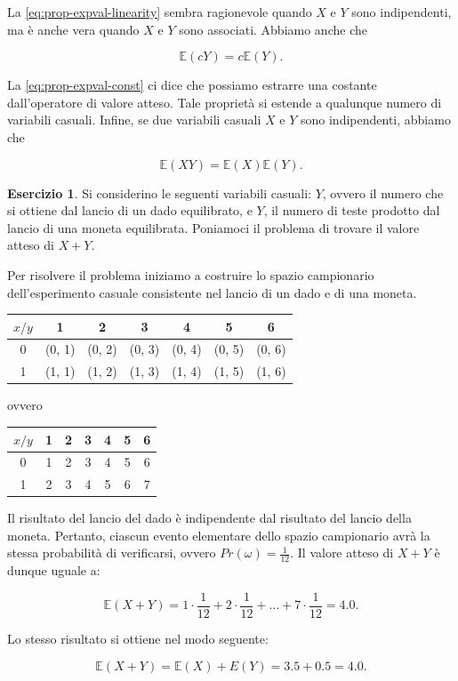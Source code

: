 \documentclass[
  11pt,
]{krantz}
\newcommand{\E}{\mathbb{E}} %
\theoremstyle{definition}
\theoremstyle{definition}
\theoremstyle{definition}
\newtheorem{exercise}{Esercizio}[chapter]
\theoremstyle{definition}
\theoremstyle{remark}
\begin{document}
La \eqref{eq:prop-expval-linearity} sembra ragionevole quando \(X\) e \(Y\) sono indipendenti, ma è anche vera quando \(X\) e \(Y\) sono associati. Abbiamo anche che

\begin{equation}
\E(cY) = c \E(Y).
\label{eq:prop-expval-const}
\end{equation}

La \eqref{eq:prop-expval-const} ci dice che possiamo estrarre una costante dall'operatore di valore atteso. Tale proprietà si estende a qualunque numero di variabili casuali. Infine, se due variabili casuali \(X\) e \(Y\) sono indipendenti, abbiamo che

\begin{equation}
\E(X Y) = \E(X) \E(Y). 
\label{eq:expval-prod-ind-rv}
\end{equation}

\begin{exercise}
Si considerino le seguenti variabili casuali: \(Y\), ovvero il numero che si ottiene dal lancio di un dado equilibrato, e \(Y\), il numero di teste prodotto dal lancio di una moneta equilibrata. Poniamoci il problema di trovare il valore atteso di \(X+Y\).

Per risolvere il problema iniziamo a costruire lo spazio campionario dell'esperimento casuale consistente nel lancio di un dado e di una moneta.

\begin{longtable}[]{@{}ccccccc@{}}
\toprule
\(x/ y\) & 1 & 2 & 3 & 4 & 5 & 6 \\
\midrule
\endhead
0 & (0, 1) & (0, 2) & (0, 3) & (0, 4) & (0, 5) & (0, 6) \\
1 & (1, 1) & (1, 2) & (1, 3) & (1, 4) & (1, 5) & (1, 6) \\
\bottomrule
\end{longtable}

\noindent ovvero

\begin{longtable}[]{@{}ccccccc@{}}
\toprule
\(x/ y\) & 1 & 2 & 3 & 4 & 5 & 6 \\
\midrule
\endhead
0 & 1 & 2 & 3 & 4 & 5 & 6 \\
1 & 2 & 3 & 4 & 5 & 6 & 7 \\
\bottomrule
\end{longtable}

\noindent Il risultato del lancio del dado è indipendente dal risultato del lancio della moneta. Pertanto, ciascun evento elementare dello spazio campionario avrà la stessa probabilità di verificarsi, ovvero \(Pr(\omega) = \frac{1}{12}\). Il valore atteso di \(X+Y\) è dunque uguale a:

\[
\E(X+Y) = 1 \cdot \frac{1}{12} + 2 \cdot \frac{1}{12} + \dots + 7 \cdot \frac{1}{12} = 4.0.
\]

Lo stesso risultato si ottiene nel modo seguente:

\[
\E(X+Y) = \E(X) + E(Y) = 3.5 + 0.5 = 4.0.
\]
\end{exercise}
\end{document}
